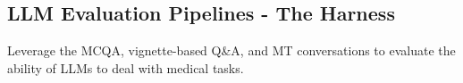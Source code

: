 
\subsection{LLM Evaluation Pipelines - The Harness}
Leverage the MCQA, vignette-based Q\&A, and MT conversations to evaluate the ability of LLMs to deal with medical tasks.




